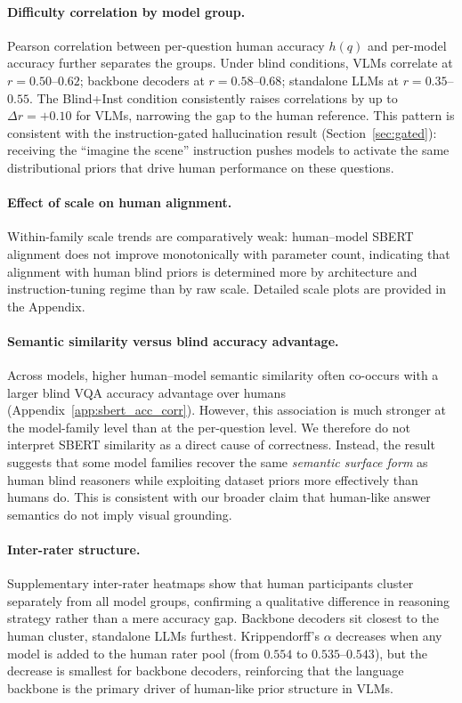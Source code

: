 \documentclass[letterpaper]{article}
\begin{document}
\paragraph{Difficulty correlation by model group.}
Pearson correlation between per-question human accuracy $h(q)$ and per-model
accuracy further separates the groups. Under blind conditions, VLMs correlate at
$r = 0.50$--$0.62$; backbone decoders at $r = 0.58$--$0.68$; standalone LLMs
at $r = 0.35$--$0.55$. The Blind+Inst condition consistently raises correlations
by up to $\Delta r = +0.10$ for VLMs, narrowing the gap to the human reference.
This pattern is consistent with the instruction-gated hallucination result
(Section~\ref{sec:gated}): receiving the ``imagine the scene'' instruction pushes
models to activate the same distributional priors that drive human performance on
these questions.

\paragraph{Effect of scale on human alignment.}
Within-family scale trends are comparatively weak: human--model SBERT
alignment does not improve monotonically with parameter count, indicating that
alignment with human blind priors is determined more by architecture and
instruction-tuning regime than by raw scale. Detailed scale plots are provided
in the Appendix.

\paragraph{Semantic similarity versus blind accuracy advantage.}
Across models, higher human--model semantic similarity often co-occurs with a
larger blind VQA accuracy advantage over humans (Appendix~\ref{app:sbert_acc_corr}).
However, this association is much stronger at the model-family level than at
the per-question level. We therefore do not interpret SBERT similarity as a
direct cause of correctness. Instead, the result suggests that some model
families recover the same \emph{semantic surface form} as human blind reasoners
while exploiting dataset priors more effectively than humans do. This is
consistent with our broader claim that human-like answer semantics do not imply
visual grounding.

\paragraph{Inter-rater structure.}
Supplementary inter-rater heatmaps show that human participants cluster
separately from all model groups, confirming a qualitative difference in
reasoning strategy rather than a mere accuracy gap. Backbone decoders sit
closest to the human cluster, standalone LLMs furthest. Krippendorff's
$\alpha$ decreases when any model is added to the human rater pool (from
$0.554$ to $0.535$--$0.543$), but the decrease is smallest for backbone
decoders, reinforcing that the language backbone is the primary driver of
human-like prior structure in VLMs.
\end{document}
